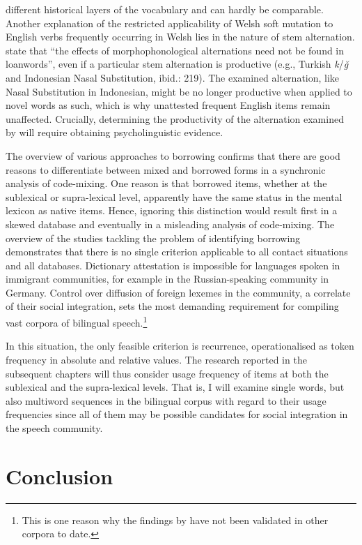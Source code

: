 different historical layers of the vocabulary and can hardly be comparable. Another explanation of the restricted applicability of Welsh soft mutation to English verbs frequently occurring in Welsh lies in the nature of stem alternation. \citet[][216]{haspelmath-sims} state that ``the effects of morphophonological alternations need not be found in loanwords'', even if a particular stem alternation is productive (e.g., Turkish \textit{k}\slash\textit{ğ} and Indonesian Nasal Substitution, ibid.: 219). The examined alternation, like Nasal Substitution in Indonesian, might be no longer productive when applied to novel words as such, which is why unattested frequent English items remain unaffected. Crucially, determining the productivity of the alternation examined by \citet{stammers-deuchar-2012} will require obtaining psycholinguistic evidence. 

The overview of various approaches to borrowing confirms that there are good reasons to differentiate between mixed and borrowed forms in a synchronic analysis of code-mixing. One reason is that borrowed items, whether at the sublexical or supra-lexical level, apparently have the same status in the mental lexicon as native items. Hence, ignoring this distinction would result first in a skewed database and eventually in a misleading analysis of code-mixing. The overview of the studies tackling the problem of identifying borrowing demonstrates that there is no single criterion applicable to all contact situations and all databases. Dictionary attestation is impossible for languages spoken in immigrant communities, for example in the Russian-speaking community in Germany. Control over diffusion of foreign lexemes in the community, a correlate of their social integration, sets the most demanding requirement for compiling vast corpora of bilingual speech.\footnote{This is one reason why the findings by \citet{poplack-etal-1988} have not been validated in other corpora to date.}

In this situation, the only feasible criterion is recurrence, operationalised as token frequency in absolute and relative values. The research reported in the subsequent chapters will thus consider usage frequency of items at both the sublexical and the supra-lexical levels. That is, I will examine single words, but also multiword sequences in the bilingual corpus with regard to their usage frequencies since all of them may be possible candidates for social integration in the speech community.

\section{Conclusion}

